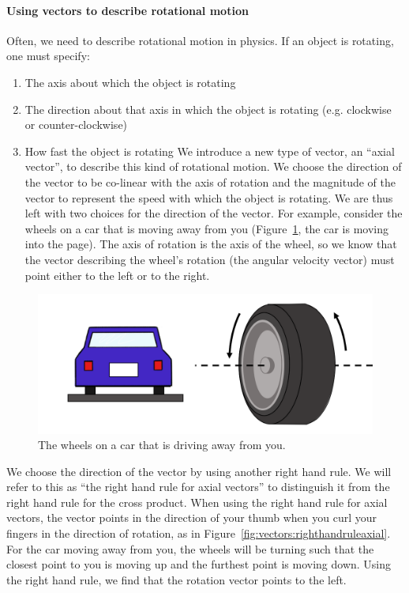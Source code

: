 \paragraph{Using vectors to describe rotational motion}\label{sec:Vectors:rotationalmotion}

Often, we need to describe rotational motion in physics. If an object is rotating, one must specify:

\begin{enumerate}
\item The axis about which the object is rotating
\item The direction about that axis in which the object is rotating (e.g. clockwise or counter-clockwise)
\item How fast the object is rotating
We introduce a new type of vector, an ``axial vector'', to describe this kind of rotational motion. We choose the direction of the vector to be co-linear with the axis of rotation and the magnitude of the vector to represent the speed with which the object is rotating. We are thus left with two choices for the direction of the vector. For example, consider the wheels on a car that is moving away from you (Figure~\ref{fig:vectors:carwheelrotation}, the car is moving into the page).  The axis of rotation is the axis of the wheel, so we know that the vector describing the wheel's rotation (the angular velocity vector) must point either to the left or to the right.
\end{enumerate}

\begin{figure}[!htbp]
\centering
\includegraphics[width=0.625\linewidth]{files/carwheelrotation-c64ab18f43acb3147151239fe27f737b.png}
\caption[]{The wheels on a car that is driving away from you.}
\label{fig:vectors:carwheelrotation}
\end{figure}

We choose the direction of the vector by using another right hand rule. We will refer to this as ``the right hand rule for axial vectors'' to distinguish it from the right hand rule for the cross product.  When using the right hand rule for axial vectors, the vector points in the direction of your thumb when you curl your fingers in the direction of rotation, as in Figure~\ref{fig:vectors:righthandruleaxial}. For the car moving away from you, the wheels will be turning such that the closest point to you is moving up and the furthest point is moving down. Using the right hand rule, we find that the rotation vector points to the left.

